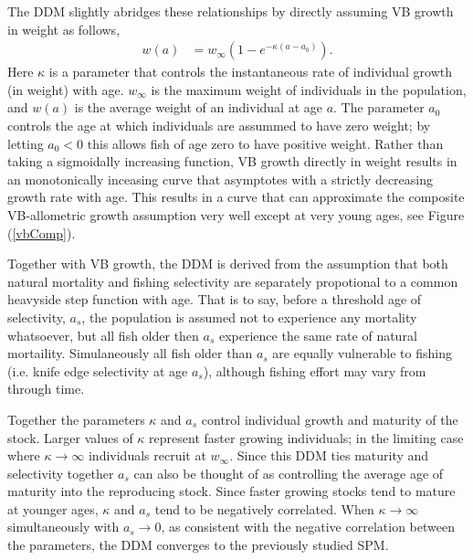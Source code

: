 %
The DDM slightly abridges these relationships by directly assuming VB
growth in weight as follows,
%
\begin{align}
w(a) &= w_\infty(1-e^{-\kappa (a-a_0)}). \label{vbGrowth}
\end{align}
%
Here $\kappa$ is a parameter that controls the instantaneous rate of individual
growth (in weight) with age. $w_\infty$ is the maximum weight of individuals
in the population, and $w(a)$ is the average weight of an individual at
age $a$. The parameter $a_0$ controls the age at which individuals are assummed
to have zero weight; by letting $a_0<0$ this allows fish of age zero to have
positive weight. Rather than taking a sigmoidally increasing function, VB growth
directly in weight results in an monotonically inceasing curve that asymptotes
with a strictly decreasing growth rate with age. This results in a curve that
can approximate the composite VB-allometric growth assumption very well except 
at very young ages, see Figure (\ref{vbComp}).

%
Together with VB growth, the DDM is derived from the assumption that
both natural mortality and fishing selectivity are separately propotional
to a common heavyside step function with age. That is to say, before a threshold
age of selectivity, $a_s$, the population is assumed not to experience any
mortality whatsoever, but all fish older then $a_s$ experience the same rate
of natural mortaility. Simulaneously all fish older than $a_s$ are equally
vulnerable to fishing (i.e. knife edge selectivity at age $a_s$), although
fishing effort may vary from through time. 

%
Together the parameters $\kappa$ and $a_s$ control individual growth and 
maturity of the stock. Larger values of $\kappa$ represent faster growing 
individuals; in the limiting case where $\kappa\to\infty$ individuals recruit 
at $w_\infty$. Since this DDM ties maturity and selectivity together $a_s$ can 
also be thought of as controlling the average age of maturity into the reproducing 
stock. Since faster growing stocks tend to mature at younger ages, $\kappa$ 
and $a_s$ tend to be negatively correlated. When $\kappa\to\infty$ simultaneously 
with $a_s\to0$, as consistent with the negative correlation between the parameters, 
the DDM converges to the previously studied SPM.

